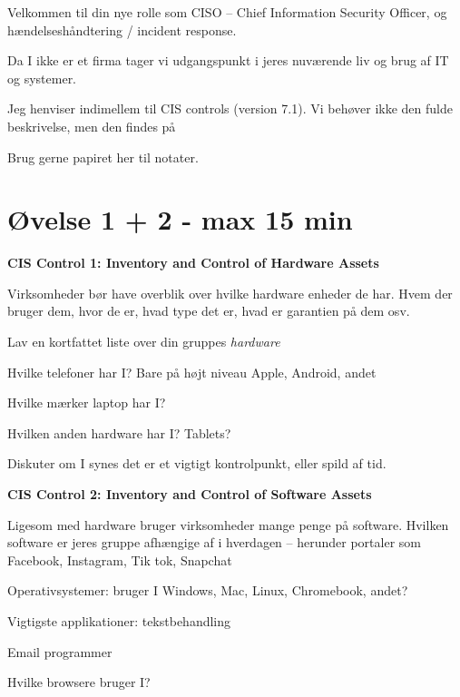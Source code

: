 \documentclass[a4paper,11pt,notitlepage,landscape]{report}
\begin{document}
\rm
{}

\newcommand{\subject}[1]{Intro to Incident Response - Track B}



\normal

Velkommen til din nye rolle som CISO -- Chief Information Security Officer, og hændelseshåndtering / incident response.

Da I ikke er et firma tager vi udgangspunkt i jeres nuværende liv og brug af IT og systemer.

Jeg henviser indimellem til CIS controls (version 7.1). Vi behøver ikke den fulde beskrivelse, men den findes på 

Brug gerne papiret her til notater.


\eject
\section*{Øvelse 1 + 2 - max 15 min}

{\bf CIS Control 1: Inventory and Control of Hardware Assets}

Virksomheder bør have overblik over hvilke hardware enheder de har. Hvem der bruger dem, hvor de er, hvad type det er, hvad er garantien på dem osv.

Lav en kortfattet liste over din gruppes \emph{hardware}

\begin{list1}
\item[\faSquareO] Hvilke telefoner har I? Bare på højt niveau Apple, Android, andet
\item[\faSquareO] Hvilke mærker laptop har I?
\item[\faSquareO] Hvilken anden hardware har I? Tablets?
\end{list1}

Diskuter om I synes det er et vigtigt kontrolpunkt, eller spild af tid.


{\bf CIS Control 2: Inventory and Control of Software Assets}

Ligesom med hardware bruger virksomheder mange penge på software. Hvilken software er jeres gruppe afhængige af i hverdagen -- herunder portaler som Facebook, Instagram, Tik tok, Snapchat

\begin{list1}
\item[\faSquareO] Operativsystemer: bruger I Windows, Mac, Linux, Chromebook, andet?
\item[\faSquareO] Vigtigste applikationer: tekstbehandling
\item[\faSquareO] Email programmer
\item[\faSquareO] Hvilke browsere bruger I?
\end{list1}
\end{document}
